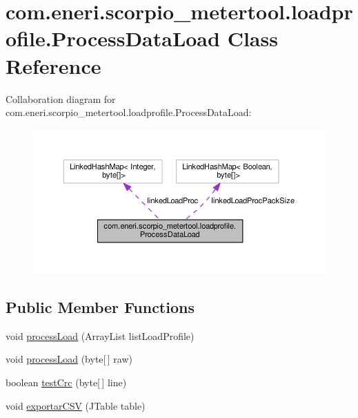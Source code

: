 \hypertarget{classcom_1_1eneri_1_1scorpio__metertool_1_1loadprofile_1_1_process_data_load}{}\section{com.\+eneri.\+scorpio\+\_\+metertool.\+loadprofile.\+Process\+Data\+Load Class Reference}
\label{classcom_1_1eneri_1_1scorpio__metertool_1_1loadprofile_1_1_process_data_load}


Collaboration diagram for com.\+eneri.\+scorpio\+\_\+metertool.\+loadprofile.\+Process\+Data\+Load\+:
\nopagebreak
\begin{figure}[H]
\begin{center}
\leavevmode
\includegraphics[width=350pt]{classcom_1_1eneri_1_1scorpio__metertool_1_1loadprofile_1_1_process_data_load__coll__graph}
\end{center}
\end{figure}
\subsection*{Public Member Functions}
\begin{DoxyCompactItemize}
\item 
void \hyperlink{classcom_1_1eneri_1_1scorpio__metertool_1_1loadprofile_1_1_process_data_load_ae853a897170b0b4e1e03187403063769}{process\+Load} (Array\+List list\+Load\+Profile)
\item 
void \hyperlink{classcom_1_1eneri_1_1scorpio__metertool_1_1loadprofile_1_1_process_data_load_adc85721c7ca115bbf0d767dc6b077147}{process\+Load} (byte\mbox{[}$\,$\mbox{]} raw)
\item 
boolean \hyperlink{classcom_1_1eneri_1_1scorpio__metertool_1_1loadprofile_1_1_process_data_load_a1b17065ec3bcc1f890731920a80883c0}{test\+Crc} (byte\mbox{[}$\,$\mbox{]} line)
\item 
void \hyperlink{classcom_1_1eneri_1_1scorpio__metertool_1_1loadprofile_1_1_process_data_load_aacb54542b58e1d1fef11e992acb588b6}{exportar\+C\+SV} (J\+Table table)
\end{DoxyCompactItemize}
